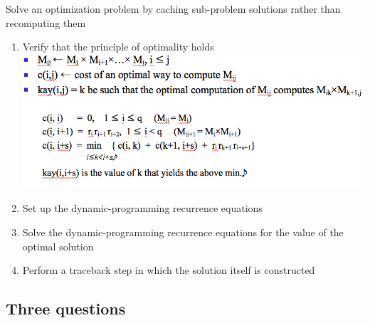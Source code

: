 \documentclass[a4paper,11pt,twoside]{book}
\begin{document}
\begin{itemize}
	Solve an optimization problem by caching  sub-problem solutions rather than recomputing them
	
	\begin{enumerate}
		\item Verify that the principle of optimality holds  \newline
		\includegraphics[scale=0.45]{pics/Recurrence.png} \newline
		
		\item Set up the dynamic-programming recurrence equations
		\item Solve the dynamic-programming recurrence equations for the value of the optimal solution
		\item Perform a traceback step in which the solution itself is constructed
	\end{enumerate}
	
\end{itemize}


\subsection{Three questions}
\end{document}
